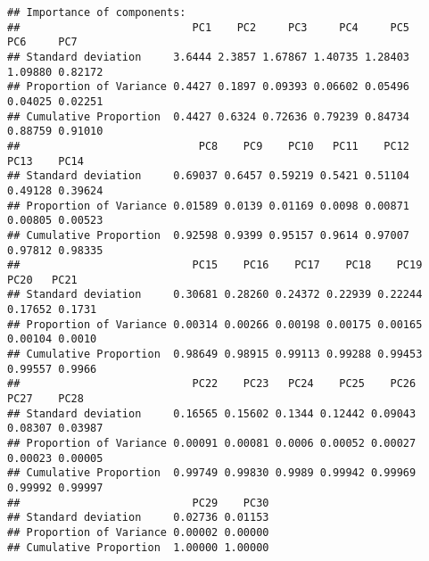 \documentclass[
]{article}
\newenvironment{Shaded}{\begin{snugshade}}{\end{snugshade}}
\newcommand{\DecValTok}[1]{\textcolor[rgb]{0.00,0.00,0.81}{#1}}
\newcommand{\FunctionTok}[1]{\textcolor[rgb]{0.00,0.00,0.00}{#1}}
\newcommand{\NormalTok}[1]{#1}
\newcommand{\OtherTok}[1]{\textcolor[rgb]{0.56,0.35,0.01}{#1}}
\newcommand{\SpecialCharTok}[1]{\textcolor[rgb]{0.00,0.00,0.00}{#1}}
\begin{document}
\begin{verbatim}
## Importance of components:
##                           PC1    PC2     PC3     PC4     PC5     PC6     PC7
## Standard deviation     3.6444 2.3857 1.67867 1.40735 1.28403 1.09880 0.82172
## Proportion of Variance 0.4427 0.1897 0.09393 0.06602 0.05496 0.04025 0.02251
## Cumulative Proportion  0.4427 0.6324 0.72636 0.79239 0.84734 0.88759 0.91010
##                            PC8    PC9    PC10   PC11    PC12    PC13    PC14
## Standard deviation     0.69037 0.6457 0.59219 0.5421 0.51104 0.49128 0.39624
## Proportion of Variance 0.01589 0.0139 0.01169 0.0098 0.00871 0.00805 0.00523
## Cumulative Proportion  0.92598 0.9399 0.95157 0.9614 0.97007 0.97812 0.98335
##                           PC15    PC16    PC17    PC18    PC19    PC20   PC21
## Standard deviation     0.30681 0.28260 0.24372 0.22939 0.22244 0.17652 0.1731
## Proportion of Variance 0.00314 0.00266 0.00198 0.00175 0.00165 0.00104 0.0010
## Cumulative Proportion  0.98649 0.98915 0.99113 0.99288 0.99453 0.99557 0.9966
##                           PC22    PC23   PC24    PC25    PC26    PC27    PC28
## Standard deviation     0.16565 0.15602 0.1344 0.12442 0.09043 0.08307 0.03987
## Proportion of Variance 0.00091 0.00081 0.0006 0.00052 0.00027 0.00023 0.00005
## Cumulative Proportion  0.99749 0.99830 0.9989 0.99942 0.99969 0.99992 0.99997
##                           PC29    PC30
## Standard deviation     0.02736 0.01153
## Proportion of Variance 0.00002 0.00000
## Cumulative Proportion  1.00000 1.00000
\end{verbatim}

\begin{Shaded}
\end{Shaded}
\end{document}
